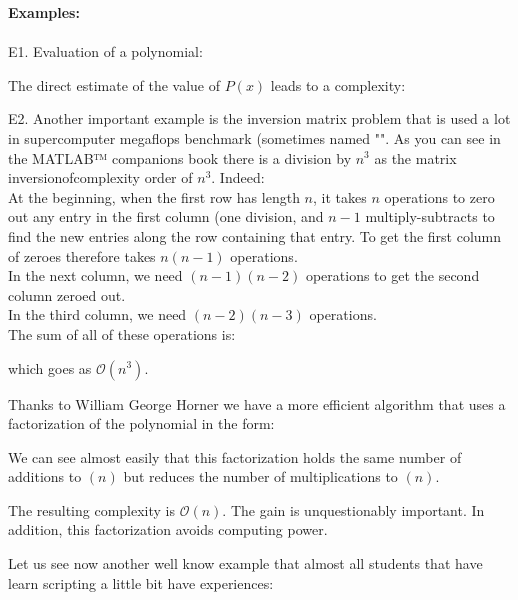 	\begin{tcolorbox}[colframe=black,colback=white,sharp corners]
\textbf{{\Large {}}Examples:}\\\\
	E1. Evaluation of a polynomial:
	
	The direct estimate of the value of $P(x)$ leads to a complexity:
	
	E2. Another important example is the inversion matrix problem that is used a lot in supercomputer megaflops benchmark (sometimes named "". As you can see in the MATLAB™ companions book there is a division by $n^3$ as the matrix inversionofcomplexity order of $n^3$. Indeed:\\
	
	At the beginning, when the first row has length $n$, it takes $n$ 
   operations to zero out any entry in the first column (one division, 
   and $n-1$ multiply-subtracts to find the new entries along the row 
   containing that entry. To get the first column of zeroes therefore 
   takes $n(n-1)$ operations.\\
   
    In the next column, we need $(n-1)(n-2)$ operations to get the second 
   column zeroed out.\\

   In the third column, we need $(n-2)(n-3)$ operations.\\
   
   The sum of all of these operations is:
   
	which goes as $\mathcal{O}(n^3)$. 
	
	\end{tcolorbox}
	Thanks to William George Horner we have a more efficient algorithm that uses a factorization of the polynomial in the form:
	
We can see almost easily that this factorization holds the same number of additions to $(n)$ but reduces the number of multiplications to $(n)$.

The resulting complexity is $\mathcal{O} (n)$. The gain is unquestionably important. In addition, this  factorization avoids computing power.

Let us see now another well know example that almost all students that have learn scripting a little bit have experiences:

